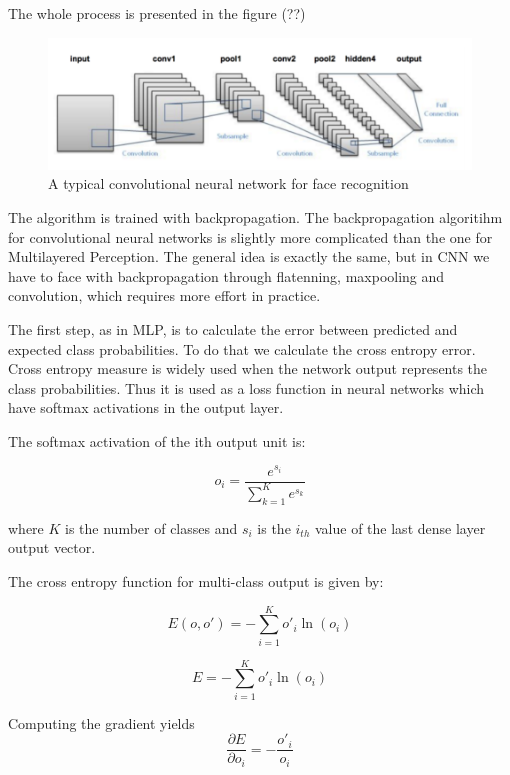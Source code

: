 The whole process is presented in the figure (??) 

\begin{figure}[H]
\centering
\includegraphics[scale=0.7]{img/proces.png}
\caption{A typical convolutional neural network for face recognition}
\end{figure}

The algorithm is trained with backpropagation. 
The backpropagation algoritihm for convolutional neural networks is slightly more complicated than the one for Multilayered Perception. The general idea is exactly the same, but in CNN we have to face with backpropagation through flatenning, maxpooling and convolution, which requires more effort in practice. 

The first step, as in MLP, is to calculate the error between predicted and expected class probabilities. To do that we calculate the cross entropy error.
Cross entropy measure is widely used when the network output represents the class probabilities. Thus it is used as a loss function in neural networks which have softmax activations in the output layer.


The softmax activation of the ith output unit is: 

\begin{equation}
o_{i} = \frac{e^{s_{i}}}{\sum_{k=1}^{K} e^{s_{k}}}
\end{equation}

where $K$ is the number of classes and $s_{i}$ is the $i_{th}$ value of the last dense layer output vector.

The cross entropy function for multi-class output is given by:

\begin{equation}
E(o, o') = -\sum_{i=1}^K o'_{i} \ln(o_{i})\end{equation} 

\begin{equation}
E = -\sum_{i=1}^K o'_{i} \ln(o_{i})
\end{equation} 

Computing the gradient yields
\begin{equation}
\frac{\partial E}{\partial o_{i}} = -\frac{o'_{i}}{o_{i}}
\end{equation}

